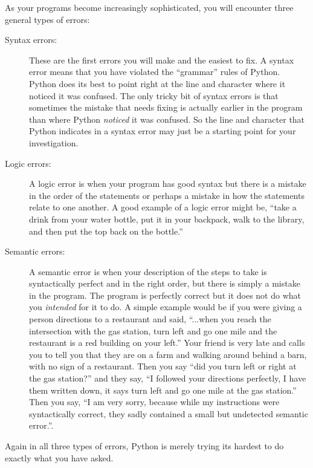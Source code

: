 As your programs become increasingly sophisticated, you will encounter three 
general types of errors:

\begin{description}

\item[Syntax errors:] These are the first errors you will make and the easiest
to fix.  A syntax error means that you have violated the ``grammar'' rules of Python.
Python does its best to point right at the line and character where 
it noticed it was confused.  The only tricky bit of syntax errors is that sometimes
the mistake that needs fixing is actually earlier in the program than where Python
{\em noticed} it was confused.  So the line and character that Python indicates in 
a syntax error may just be a starting point for your investigation.

\item[Logic errors:] A logic error is when your program has good syntax but there is a mistake 
in the order of the statements or perhaps a mistake in how the statements relate to one another.
A good example of a logic error might be, ``take a drink from your water bottle, put it 
in your backpack, walk to the library, and then put the top back on the bottle.''

\item[Semantic errors:] A semantic error is when your description of the steps to take 
is syntactically perfect and in the right order, but there is simply a mistake in 
the program.  The program is perfectly correct but it does not do what
you {\em intended} for it to do. A simple example would
be if you were giving a person directions to a restaurant and said, ``...when you reach
the intersection with the gas station, turn left and go one mile and the restaurant
is a red building on your left.''  Your friend is very late and calls you to tell you that
they are on a farm and walking around behind a barn, with no sign of a restaurant.  
Then you say ``did you turn left or right at the gas station?'' and 
they say, ``I followed your directions perfectly, I have 
them written down, it says turn left and go one mile at the gas station.''  Then you say,
``I am very sorry, because while my instructions were syntactically correct, they 
sadly contained a small but undetected semantic error.''. 

\end{description}

Again in all three types of errors, Python is merely trying its hardest to 
do exactly what you have asked.

